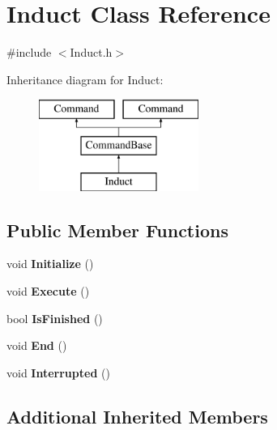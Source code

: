 \hypertarget{class_induct}{}\section{Induct Class Reference}
\label{class_induct}


{\ttfamily \#include $<$Induct.\+h$>$}

Inheritance diagram for Induct\+:\begin{figure}[H]
\begin{center}
\leavevmode
\includegraphics[height=3.000000cm]{class_induct}
\end{center}
\end{figure}
\subsection*{Public Member Functions}
\begin{DoxyCompactItemize}
\item 
\hypertarget{class_induct_a376883b40ea5f30e809258dbc2af25d6}{}void {\bfseries Initialize} ()\label{class_induct_a376883b40ea5f30e809258dbc2af25d6}

\item 
\hypertarget{class_induct_a69b0aab1025a5c5f1913dc9030b608b0}{}void {\bfseries Execute} ()\label{class_induct_a69b0aab1025a5c5f1913dc9030b608b0}

\item 
\hypertarget{class_induct_a23511705e0e9f4fb677bd9790c64d6b6}{}bool {\bfseries Is\+Finished} ()\label{class_induct_a23511705e0e9f4fb677bd9790c64d6b6}

\item 
\hypertarget{class_induct_a2647c17f70beac0ca882cd304d0cd8df}{}void {\bfseries End} ()\label{class_induct_a2647c17f70beac0ca882cd304d0cd8df}

\item 
\hypertarget{class_induct_a4d32fbfac6d16e3ed5f260d9b70001a5}{}void {\bfseries Interrupted} ()\label{class_induct_a4d32fbfac6d16e3ed5f260d9b70001a5}

\end{DoxyCompactItemize}
\subsection*{Additional Inherited Members}


